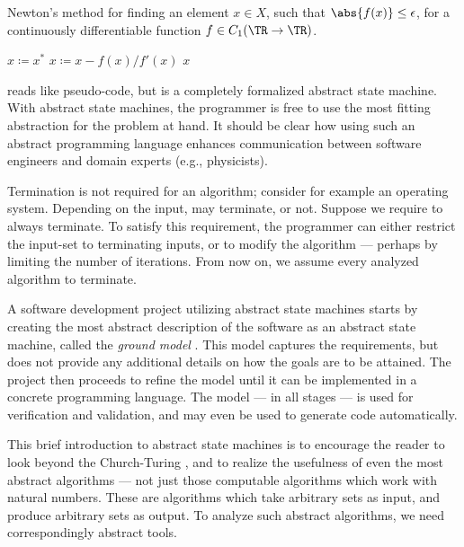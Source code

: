\documentclass[b5paper, english, oneside]{memoir}
\begin{document}
\begin{algorithm}
\caption{Newton's method for finding an element $x \in X$, such that $\abs{f(x)} \leq \epsilon$, for a continuously differentiable function $f \in C_1(\TR \to \TR)$.}
\label{alg:FindZero}
\begin{algorithmic}[1]
\State $x \coloneqq x^*$
  \State $x \coloneqq x - f(x) / f'(x)$
\EndWhile
\State \Return $x$
\EndProcedure
\end{algorithmic}
\end{algorithm}

 reads like pseudo-code, but is a completely formalized abstract state machine. With abstract state machines, the programmer is free to use the most fitting abstraction for the problem at hand. It should be clear how using such an abstract programming language enhances communication between software engineers and domain experts (e.g., physicists). 

Termination is not required for an algorithm; consider for example an operating system. Depending on the input,  may terminate, or not. Suppose we require  to always terminate. To satisfy this requirement, the programmer can either restrict the input-set to terminating inputs, or to modify the algorithm --- perhaps by limiting the number of iterations. From now on, we assume every analyzed algorithm to terminate.

A software development project utilizing abstract state machines starts by creating the most abstract description of the software as an abstract state machine, called the \emph{ground model} \cite{ASMBook}. This model captures the requirements, but does not provide any additional details on how the goals are to be attained. The project then proceeds to refine the model until it can be implemented in a concrete programming language. The model --- in all stages --- is used for verification and validation, and may even be used to generate code automatically.

This brief introduction to abstract state machines is to encourage the reader to look beyond the Church-Turing \manuscript{}, and to realize the usefulness of even the most abstract algorithms --- not just those computable algorithms which work with natural numbers. These are algorithms which take arbitrary sets as input, and produce arbitrary sets as output. To analyze such abstract algorithms, we need correspondingly abstract tools.
\end{document}
